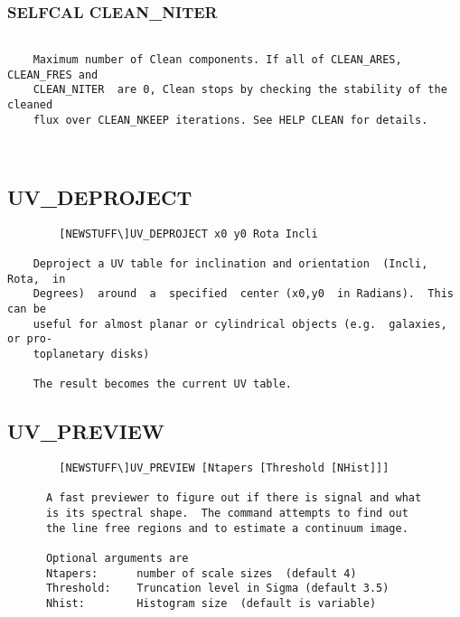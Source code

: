 \subsubsection{SELFCAL CLEAN\_NITER}
\begin{verbatim}

    Maximum number of Clean components. If all of CLEAN_ARES, CLEAN_FRES and
    CLEAN_NITER  are 0, Clean stops by checking the stability of the cleaned
    flux over CLEAN_NKEEP iterations. See HELP CLEAN for details.



\end{verbatim}
\subsection{UV\_DEPROJECT}
\begin{verbatim}
        [NEWSTUFF\]UV_DEPROJECT x0 y0 Rota Incli

    Deproject a UV table for inclination and orientation  (Incli,  Rota,  in
    Degrees)  around  a  specified  center (x0,y0  in Radians).  This can be
    useful for almost planar or cylindrical objects (e.g.  galaxies, or pro-
    toplanetary disks)

    The result becomes the current UV table.

\end{verbatim}
\subsection{UV\_PREVIEW}
\begin{verbatim}
        [NEWSTUFF\]UV_PREVIEW [Ntapers [Threshold [NHist]]]

      A fast previewer to figure out if there is signal and what
      is its spectral shape.  The command attempts to find out
      the line free regions and to estimate a continuum image.

      Optional arguments are
      Ntapers:      number of scale sizes  (default 4)
      Threshold:    Truncation level in Sigma (default 3.5)
      Nhist:        Histogram size  (default is variable)

\end{verbatim}
